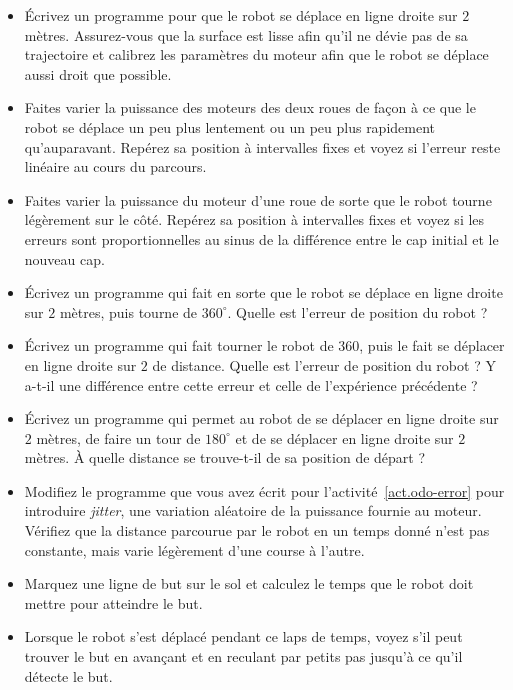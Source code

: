 {\begin{framed}
\begin{itemize}
\item Écrivez un programme pour que le robot se déplace en ligne droite sur $2$ mètres. Assurez-vous que la surface est lisse afin qu'il ne dévie pas de sa trajectoire et calibrez les paramètres du moteur afin que le robot se déplace aussi droit que possible.
\item Faites varier la puissance des moteurs des deux roues de façon à ce que le robot se déplace un peu plus lentement ou un peu plus rapidement qu'auparavant. Repérez sa position à intervalles fixes et voyez si l'erreur reste linéaire au cours du parcours.
\item Faites varier la puissance du moteur d'une roue de sorte que le robot tourne légèrement sur le côté. Repérez sa position à intervalles fixes et voyez si les erreurs sont proportionnelles au sinus de la différence entre le cap initial et le nouveau cap.
\end{itemize}
\end{framed}

\begin{framed}
\begin{itemize}
\item Écrivez un programme qui fait en sorte que le robot se déplace en ligne droite sur $2$ mètres, puis tourne de $360^\circ$. Quelle est l'erreur de position du robot ?
\item Écrivez un programme qui fait tourner le robot de $360$, puis le fait se déplacer en ligne droite sur $2$ de distance. Quelle est l'erreur de position du robot ? Y a-t-il une différence entre cette erreur et celle de l'expérience précédente ?
\item Écrivez un programme qui permet au robot de se déplacer en ligne droite sur $2$ mètres, de faire un tour de $180^\circ$ et de se déplacer en ligne droite sur $2$ mètres. À quelle distance se trouve-t-il de sa position de départ ?
\end{itemize}
\end{framed}

\begin{framed}
\begin{itemize}
\item Modifiez le programme que vous avez écrit pour l'activité~\ref{act.odo-error} pour introduire \emph{jitter}, une variation aléatoire de la puissance fournie au moteur. Vérifiez que la distance parcourue par le robot en un temps donné n'est pas constante, mais varie légèrement d'une course à l'autre.
\item Marquez une ligne de but sur le sol et calculez le temps que le robot doit mettre pour atteindre le but.
\item Lorsque le robot s'est déplacé pendant ce laps de temps, voyez s'il peut trouver le but en avançant et en reculant par petits pas jusqu'à ce qu'il détecte le but.
\end{itemize}
\end{framed}

}
